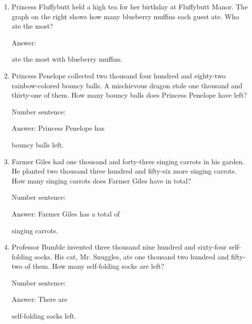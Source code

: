 \documentclass{tufte-book}
\begin{document}
\begin{enumerate}
\item {}
Princess Fluffybutt held a high tea for her birthday at Fluffybutt Manor.
The graph on the right shows how many blueberry muffins each guest ate.
Who ate the most?

Answer: \dotfill\medskip\par
ate the most with \dotfill blueberry muffins.

\item Princess Penelope collected two thousand four hundred and eighty-two rainbow-colored bouncy balls. A mischievous dragon stole one thousand and thirty-one of them. How many bouncy balls does Princess Penelope have left?

\medskip Number sentence: \dotfill\medskip

Answer: Princess Penelope has \dotfill\medskip\par\mbox{}\dotfill\medskip\par\mbox{}\dotfill\bigskip
bouncy balls left.

\item Farmer Giles had one thousand and forty-three singing carrots in his garden. He planted two thousand three hundred and fifty-six more singing carrots. How many singing carrots does Farmer Giles have in total?

\medskip Number sentence: \dotfill\medskip

Answer: Farmer Giles has a total of
\dotfill\medskip\par\mbox{}\dotfill\medskip\par\mbox{}\dotfill\bigskip
singing carrots.

\item Professor Bumble invented three thousand nine hundred and sixty-four self-folding socks. His cat, Mr. Snuggles, ate one thousand two hundred and fifty-two of them. How many self-folding socks are left?

\medskip Number sentence: \dotfill\medskip

Answer: There are 
\dotfill\medskip\par\mbox{}\dotfill\medskip\par\mbox{}\dotfill\bigskip
self-folding socks left.

\end{enumerate}
\end{document}
